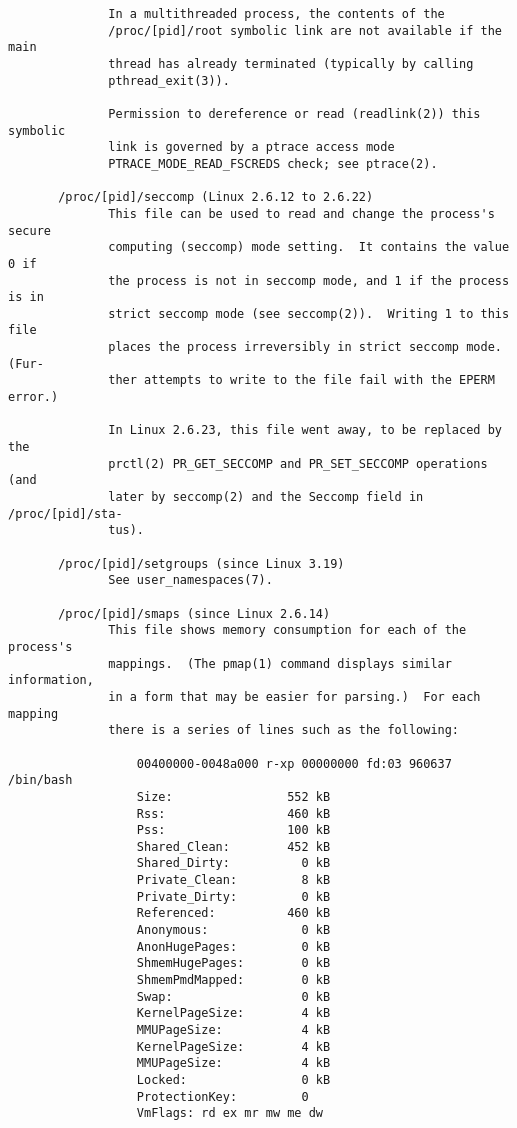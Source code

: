 \documentclass[]{article}
\begin{document}
\begin{verbatim}
              In a multithreaded process, the contents of the
              /proc/[pid]/root symbolic link are not available if the main
              thread has already terminated (typically by calling
              pthread_exit(3)).

              Permission to dereference or read (readlink(2)) this symbolic
              link is governed by a ptrace access mode
              PTRACE_MODE_READ_FSCREDS check; see ptrace(2).

       /proc/[pid]/seccomp (Linux 2.6.12 to 2.6.22)
              This file can be used to read and change the process's secure
              computing (seccomp) mode setting.  It contains the value 0 if
              the process is not in seccomp mode, and 1 if the process is in
              strict seccomp mode (see seccomp(2)).  Writing 1 to this file
              places the process irreversibly in strict seccomp mode.  (Fur‐
              ther attempts to write to the file fail with the EPERM error.)

              In Linux 2.6.23, this file went away, to be replaced by the
              prctl(2) PR_GET_SECCOMP and PR_SET_SECCOMP operations (and
              later by seccomp(2) and the Seccomp field in /proc/[pid]/sta‐
              tus).

       /proc/[pid]/setgroups (since Linux 3.19)
              See user_namespaces(7).

       /proc/[pid]/smaps (since Linux 2.6.14)
              This file shows memory consumption for each of the process's
              mappings.  (The pmap(1) command displays similar information,
              in a form that may be easier for parsing.)  For each mapping
              there is a series of lines such as the following:

                  00400000-0048a000 r-xp 00000000 fd:03 960637       /bin/bash
                  Size:                552 kB
                  Rss:                 460 kB
                  Pss:                 100 kB
                  Shared_Clean:        452 kB
                  Shared_Dirty:          0 kB
                  Private_Clean:         8 kB
                  Private_Dirty:         0 kB
                  Referenced:          460 kB
                  Anonymous:             0 kB
                  AnonHugePages:         0 kB
                  ShmemHugePages:        0 kB
                  ShmemPmdMapped:        0 kB
                  Swap:                  0 kB
                  KernelPageSize:        4 kB
                  MMUPageSize:           4 kB
                  KernelPageSize:        4 kB
                  MMUPageSize:           4 kB
                  Locked:                0 kB
                  ProtectionKey:         0
                  VmFlags: rd ex mr mw me dw


\end{verbatim}
\end{document}
